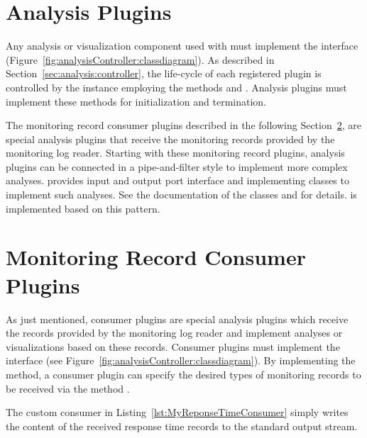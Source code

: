 
\setJavaCodeListing


\section{Analysis Plugins}\label{sec:analysis:plugins}

Any analysis or visualization component used with \KiekerAnalysisPart{} must %
implement the interface  (Figure~\ref{fig:analysisController:classdiagram}). %
As described in Section~\ref{sec:analysis:controller}, the life-cycle of each %
registered plugin is controlled by the  instance %
employing the methods  and . Analysis plugins %
must implement these methods for initialization and termination.

The monitoring record consumer plugins described in the following %
Section~\ref{sec:analysis:consumer}, are special analysis plugins that receive %
the monitoring records provided by the monitoring log reader. %
Starting with these monitoring record plugins, analysis plugins can be connected %
in a pipe-and-filter style to implement more complex analyses. %
\Kieker{} provides input and output port interface and implementing classes %
to implement such analyses. See the documentation of the classes  %
and  for details. \KiekerTraceAnalysis{} is implemented %
based on this pattern. 

\section{Monitoring Record Consumer Plugins}\label{sec:analysis:consumer}

As just mentioned, consumer plugins are special analysis plugins which receive %
the records provided by the monitoring log reader and implement analyses or %
visualizations based on these records. %
Consumer plugins must implement the interface  %
(see Figure~\ref{fig:analysisController:classdiagram}). %
By implementing the  method, a consumer plugin %
can specify the desired types of monitoring records to be received via the %
method .


The custom consumer in Listing~\ref{lst:MyReponseTimeConsumer} simply writes %
the content of the received response time records to the standard output stream.

\setJavaCodeListing

